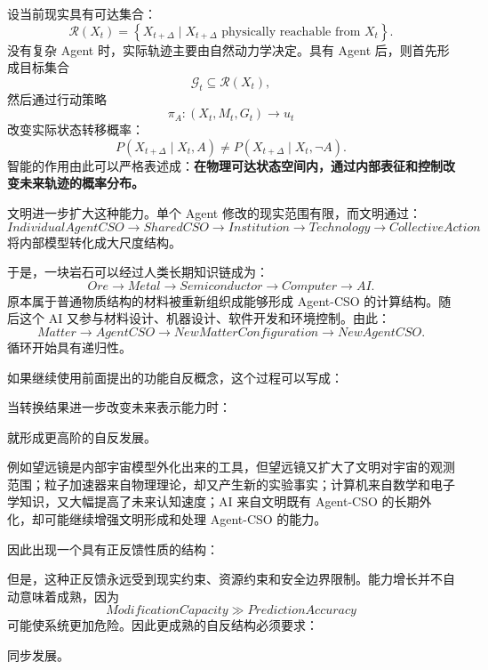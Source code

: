 设当前现实具有可达集合：
\[
\mathcal R(X_t)
=
\left\{
X_{t+\Delta}
\mid
X_{t+\Delta}
\text{ physically reachable from }X_t
\right\}.
\]
没有复杂 Agent 时，实际轨迹主要由自然动力学决定。具有 Agent 后，则首先形成目标集合
\[
\mathcal G_t
\subseteq
\mathcal R(X_t),
\]
然后通过行动策略
\[
\pi_A
:
(X_t,M_t,G_t)
\rightarrow
u_t
\]
改变实际状态转移概率：
\[
P
\left(
X_{t+\Delta}
\mid
X_t,A
\right)
\neq
P
\left(
X_{t+\Delta}
\mid
X_t,\neg A
\right).
\]
智能的作用由此可以严格表述成：\textbf{在物理可达状态空间内，通过内部表征和控制改变未来轨迹的概率分布。}

文明进一步扩大这种能力。单个 Agent 修改的现实范围有限，而文明通过：
\[
IndividualAgentCSO
\rightarrow
SharedCSO
\rightarrow
Institution
\rightarrow
Technology
\rightarrow
CollectiveAction
\]
将内部模型转化成大尺度结构。

于是，一块岩石可以经过人类长期知识链成为：
\[
Ore
\rightarrow
Metal
\rightarrow
Semiconductor
\rightarrow
Computer
\rightarrow
AI.
\]
原本属于普通物质结构的材料被重新组织成能够形成 Agent-CSO 的计算结构。随后这个 AI 又参与材料设计、机器设计、软件开发和环境控制。由此：
\[
Matter
\rightarrow
AgentCSO
\rightarrow
NewMatterConfiguration
\rightarrow
NewAgentCSO.
\]
循环开始具有递归性。

如果继续使用前面提出的功能自反概念，这个过程可以写成：
\begin{statementbox}
\centering
{}
\end{statementbox}
当转换结果进一步改变未来表示能力时：
\begin{statementbox}
\centering
{}
\end{statementbox}
就形成更高阶的自反发展。

例如望远镜是内部宇宙模型外化出来的工具，但望远镜又扩大了文明对宇宙的观测范围；粒子加速器来自物理理论，却又产生新的实验事实；计算机来自数学和电子学知识，又大幅提高了未来认知速度；AI 来自文明既有 Agent-CSO 的长期外化，却可能继续增强文明形成和处理 Agent-CSO 的能力。

因此出现一个具有正反馈性质的结构：
\begin{statementbox}
\centering
{}
\end{statementbox}
但是，这种正反馈永远受到现实约束、资源约束和安全边界限制。能力增长并不自动意味着成熟，因为
\[
ModificationCapacity
\gg
PredictionAccuracy
\]
可能使系统更加危险。因此更成熟的自反结构必须要求：
\begin{statementbox}
\centering
{}
\end{statementbox}
同步发展。

